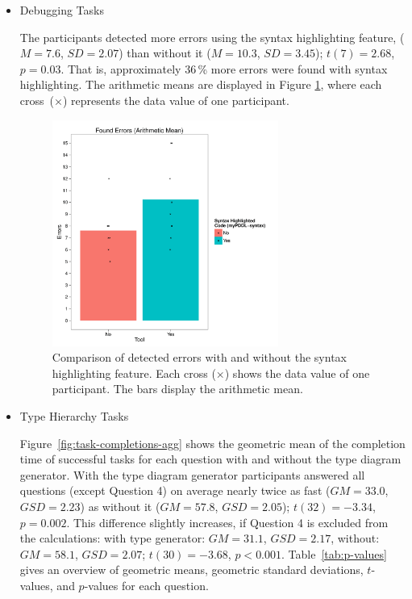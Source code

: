 \documentclass[runningheads]{llncs}
\begin{document}
\begin{itemize}
\item Debugging Tasks

  The participants detected more errors using the syntax highlighting
  feature, ($M = 7.6$, $SD = 2.07$) than without it ($M = 10.3$,
  $SD = 3.45$); $t(7) = 2.68$, $p = 0.03$.  That is, approximately
  36\,\% more errors were found with syntax highlighting. The
  arithmetic means are displayed in Figure
  \ref{fig:found-errors-combined}, where each cross~($\times$)
  represents the data value of one participant.
\begin{figure}[h]
  \centering
  \hspace{1.7cm}
  \includegraphics[width=0.7\textwidth]{found_errors}
  \caption[Diagram of detected errors]{Comparison of detected errors
    with and without the syntax highlighting feature. Each cross
    ($\times$) shows the data value of one participant. The bars
    display the arithmetic mean.}
\label{fig:found-errors-combined}
\end{figure}

\item Type Hierarchy Tasks

  Figure~\ref{fig:task-completions-agg} shows the geometric mean of
  the completion time of successful tasks for each question with and
  without the type diagram generator. With the type diagram generator
  participants answered all questions (except Question 4) on average
  nearly twice as fast ($GM = 33.0$, $GSD = 2.23$) as without it
  ($GM = 57.8$, $GSD = 2.05$); $t(32) = -3.34$, $p = 0.002$. This
  difference slightly increases, if Question 4 is excluded from the
  calculations: with type generator: $GM = 31.1$, $GSD = 2.17$,
  without: $GM = 58.1$, $GSD = 2.07$; $t(30) = -3.68$, $p < 0.001$.
  Table~\ref{tab:p-values} gives an overview of geometric means,
  geometric standard deviations, $t$-values, and $p$-values for each
  question.


\end{itemize}
\end{document}
